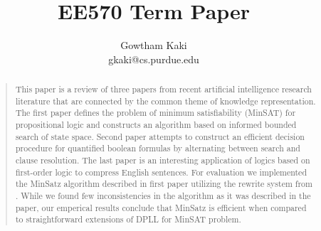 \documentclass[letterpaper]{article}
\begin{document}
\title{EE570 Term Paper}
\author{Gowtham Kaki\\
gkaki@cs.purdue.edu\\
}

\maketitle

\begin{abstract}
\begin{quote}
This paper is a review of three papers from recent artificial intelligence
research literature that are connected by the common theme of knowledge
representation. The first paper \cite{minsat} defines the problem of minimum
satisfiability (MinSAT) for propositional logic and constructs an algorithm
based on informed bounded search of state space. Second paper \cite{qbf}
attempts to construct an efficient decision procedure for quantified boolean
formulas by alternating between search and clause resolution. The last paper
\cite{nlp} is an interesting application of logics based on first-order logic to
compress English sentences. For evaluation we implemented the MinSatz algorithm
described in first paper utilizing the rewrite system from
\cite{siskind-rewrite}. While we found few inconsistencies in the algorithm as
it was described in the paper, our emperical results conclude that MinSatz is
efficient when compared to straightforward extensions of DPLL for MinSAT
problem.
\end{quote}
\end{abstract}









\end{document}
